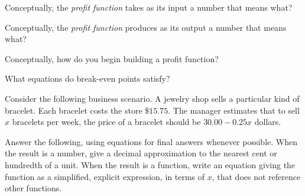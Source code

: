\begin{ProblemSet}[pencil space=1.25in]
 \newpage

 \begin{Problem}
  Conceptually, the \emph{profit function} takes as its input a number that means what?
 \end{Problem}
 \begin{Problem}
  Conceptually, the \emph{profit function} produces as its output a number that means what?
 \end{Problem}
 \begin{Problem}
  Conceptually, how do you begin building a profit function?
 \end{Problem}
 \begin{Problem}
  What equations do break-even points satisfy?
 \end{Problem}
\end{ProblemSet}

\newpage

Consider the following business scenario.
A jewelry shop sells a particular kind of bracelet.
Each bracelet costs the store $\$15.75$.
The manager estimates that to sell $x$ bracelets per week, the price of a bracelet should be $30.00 - 0.25 x$ dollars.

Answer the following, using equations for final answers whenever possible.
When the result is a number, give a decimal approximation to the nearest cent or hundredth of a unit.
When the result is a function, write an equation giving the function as a simplified, explicit expression, in terms of $x$, that does not reference other functions.

